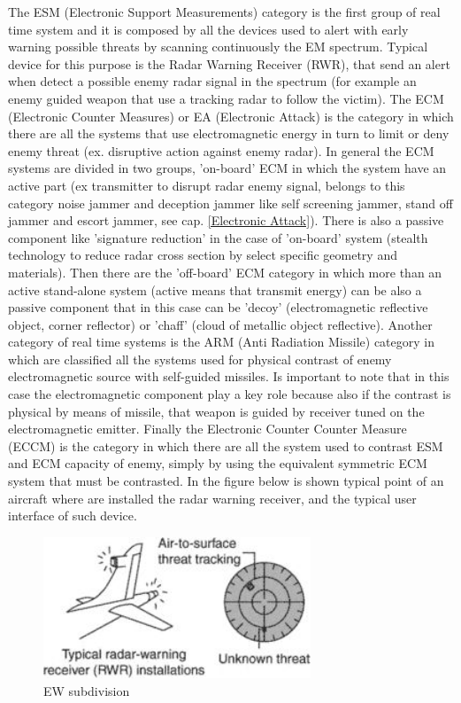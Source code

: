 \documentclass[12pt]{report}
\begin{document}
The ESM (Electronic Support Measurements) category is the first group of real time system and it is composed by all the devices used to alert with early warning possible threats by scanning continuously the EM spectrum.
Typical device for this purpose is the Radar Warning Receiver (RWR), that send an alert when detect a possible enemy radar signal in the spectrum (for example an enemy guided weapon that use a tracking radar to follow the victim). \newline The ECM (Electronic Counter Measures) or EA (Electronic Attack) is the category in which there are all the systems that use electromagnetic energy in turn to limit or deny enemy threat (ex. disruptive action against enemy radar). In general the ECM systems are divided in two groups, 'on-board' ECM in which the system have an active part (ex transmitter to disrupt radar enemy signal, belongs to this category noise jammer and deception jammer like self screening jammer, stand off jammer and escort jammer, see cap. \ref{Electronic Attack}). There is also a passive component like 'signature reduction' in the case of 'on-board' system (stealth technology to reduce radar cross section by select specific geometry and materials). Then there are the 'off-board' ECM category in which more than an active stand-alone system (active means that transmit energy) can be also a passive component that in this case can be 'decoy' (electromagnetic reflective object, corner reflector) or 'chaff' (cloud of metallic object reflective). \newline Another category of real time systems is the ARM (Anti Radiation Missile) category in which are classified all the systems used for physical contrast of enemy electromagnetic source with self-guided missiles. Is important to note that in this case the electromagnetic component play a key role because also if the contrast is physical by means of missile, that weapon is guided by receiver tuned on the electromagnetic emitter. Finally the Electronic Counter Counter Measure (ECCM) is the category in which there are all the system used to contrast ESM and ECM capacity of enemy, simply by using the equivalent symmetric ECM system that must be contrasted. In the figure below is shown typical point of an aircraft where are installed the radar warning receiver, and the typical user interface of such device.
\begin{figure}[h!]
    \centering
    \includegraphics[width=8cm]{Pictures/RWR.jpg}
    \caption{EW subdivision}
    \label{EWsubdivision}
\end{figure} 
\newpage    
\end{document}
